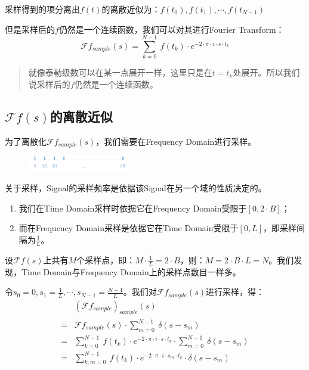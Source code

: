 采样得到的项分离出$f(t)$的离散近似为：$f(t_0),f(t_1),\cdots,f(t_{N-1})$

但是采样后的$f$仍然是一个连续函数，我们可以对其进行Fourier Transform：
$$
	\mathcal{F}f_{sample}(s)=\sum\limits_{k=0}^{N-1}\ f(t_k)\cdot e^{-2\cdot \pi\cdot i\cdot s\cdot t_k}
$$
\begin{quote}
	就像泰勒级数可以在某一点展开一样，这里只是在$t=t_k$处展开。所以我们说采样后的$f$仍然是一个连续函数。
\end{quote}
\subsection{$\mathcal{F}f(s)$的离散近似}
为了离散化$\mathcal{F}f_{sample}(s)$，我们需要在Frequency Domain进行采样。
\begin{figure}[H]
	\centering
	\includegraphics[width=0.4\textwidth]{assets/DFT2.png}
\end{figure}
关于采样，Signal的采样频率是依据该Signal在另一个域的性质决定的。
\begin{enumerate}
	\item 我们在Time Domain采样时依据它在Frequency Domain受限于$[0,2\cdot B]$；
	\item 而在Frequency Domain采样是依据它在Time Domain受限于$[0,L]$，即采样间隔为$\frac{1}{L}$。
\end{enumerate}


设$\mathcal{F}f(s)$上共有$M$个采样点，即：$M\cdot \frac{1}{L}=2\cdot B$，则：$M=2\cdot B\cdot L=N$。我们发现，Time Domain与Frequency Domain上的采样点数目一样多。

令$s_0=0,s_1=\frac{1}{L},\cdots,s_{N-1}=\frac{N-1}{L}$。我们对$\mathcal{F}f_{sample}(s)$进行采样，得：
\begin{align*}
	  & (\mathcal{F}f_{sample})_{sample}(s)                                                                                     \\
	= & \mathcal{F}f_{sample}(s)\cdot \sum\limits_{m=0}^{N-1}\ \delta(s-s_m)                                                    \\
	= & \sum\limits_{k=0}^{N-1}\ f(t_k)\cdot e^{-2\cdot \pi\cdot i\cdot s\cdot t_k}\cdot \sum\limits_{m=0}^{N-1}\ \delta(s-s_m) \\
	= & \sum\limits_{k,m=0}^{N-1}\ f(t_k)\cdot e^{-2\cdot \pi\cdot i\cdot s_m\cdot t_k}\cdot \delta(s-s_m)
\end{align*}

